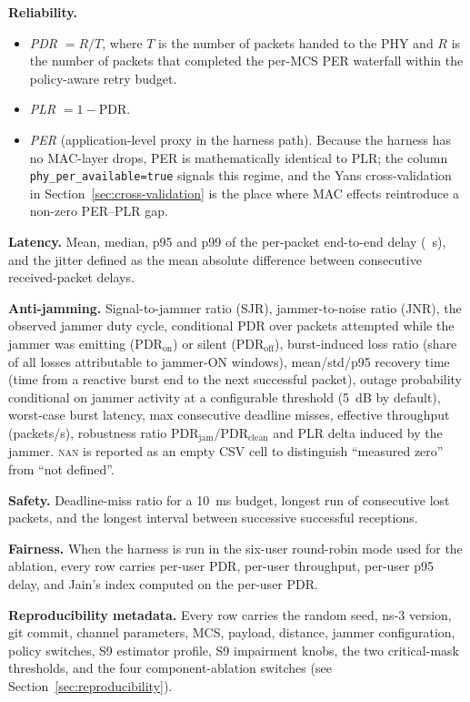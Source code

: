 \documentclass[journal,onecolumn,11pt,a4paper]{IEEEtran}
\begin{document}
\textbf{Reliability.}
\begin{itemize}
  \item \emph{PDR} $= R/T$, where $T$ is the number of packets handed
        to the PHY and $R$ is the number of packets that completed
        the per-MCS PER waterfall within the policy-aware retry
        budget.
  \item \emph{PLR} $= 1 - \mathrm{PDR}$.
  \item \emph{PER} (application-level proxy in the harness path).
        Because the harness has no MAC-layer drops, PER is
        mathematically identical to PLR; the column
        \texttt{phy\_per\_available=true} signals this regime, and the
        Yans cross-validation in Section~\ref{sec:cross-validation}
        is the place where MAC effects reintroduce a non-zero
        PER--PLR gap.
\end{itemize}

\textbf{Latency.} Mean, median, p95 and p99 of the per-packet
end-to-end delay (\SI{}{s}), and the jitter defined as the mean
absolute difference between consecutive received-packet delays.

\textbf{Anti-jamming.} Signal-to-jammer ratio (SJR),
jammer-to-noise ratio (JNR), the observed jammer duty cycle,
conditional PDR over packets attempted while the jammer was emitting
($\mathrm{PDR}_{\mathrm{on}}$) or silent ($\mathrm{PDR}_{\mathrm{off}}$),
burst-induced loss ratio (share of all losses attributable to
jammer-ON windows), mean/std/p95 recovery time (time from a reactive
burst end to the next successful packet), outage probability
conditional on jammer activity at a configurable threshold
(\SI{5}{dB} by default), worst-case burst latency, max consecutive
deadline misses, effective throughput (packets/s), robustness ratio
$\mathrm{PDR}_{\mathrm{jam}}/\mathrm{PDR}_{\mathrm{clean}}$ and PLR
delta induced by the jammer. \textsc{nan} is reported as an empty
CSV cell to distinguish ``measured zero'' from ``not defined''.

\textbf{Safety.} Deadline-miss ratio for a \SI{10}{ms} budget,
longest run of consecutive lost packets, and the longest interval
between successive successful receptions.

\textbf{Fairness.} When the harness is run in the six-user
round-robin mode used for the ablation, every row carries per-user
PDR, per-user throughput, per-user p95 delay, and Jain's index
\cite{Jai84} computed on the per-user PDR.

\textbf{Reproducibility metadata.} Every row carries the random seed,
ns-3 version, git commit, channel parameters, MCS, payload, distance,
jammer configuration, policy switches, S9 estimator profile, S9
impairment knobs, the two critical-mask thresholds, and the four
component-ablation switches (see Section~\ref{sec:reproducibility}).
\end{document}
